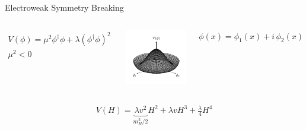 \documentclass[11pt, xcolor={dvipsnames}, aspectratio=169]{beamer}
\begin{document}
\begin{frame}{Electroweak Symmetry Breaking}

  \begin{columns}
    \centering


    \begin{align*}
      V(\phi) = \mu^2 \phi^\dag \phi + \lambda (\phi^\dag \phi)^2 \\
      \mu^2 < 0
    \end{align*}

    \centering

    \includegraphics[width=\textwidth]{theory/potential}

    $\phi(x) = \phi_1(x) + i \, \phi_2(x)$
  \end{columns}

  \begin{align*}
    V(H) = \underbrace{\lambda v^2}_{m_{H}^2 / 2} H^2 + \lambda v H^3 + \frac{\lambda}{4} H^4
  \end{align*}
\end{frame}

\end{document}
